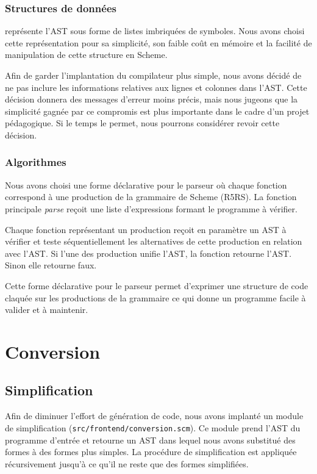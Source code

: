 \documentclass[11pt]{report}
\begin{document}
\subsection{Structures de données}

\sins{} représente l'AST sous forme de listes imbriquées de symboles. Nous
avons choisi cette représentation pour sa simplicité, son faible coût en
mémoire et la facilité de manipulation de cette structure en Scheme.

Afin de garder l'implantation du compilateur plus simple, nous avons
décidé de ne pas inclure les informations relatives aux lignes et
colonnes dans l'AST. Cette décision donnera des messages d'erreur
moins précis, mais nous jugeons que la simplicité gagnée par ce
compromis est plus importante dans le cadre d'un projet pédagogique.
Si le temps le permet, nous pourrons considérer revoir cette décision.

\subsection{Algorithmes}

Nous avons choisi une forme déclarative pour le parseur où chaque fonction
correspond à une production de la grammaire de Scheme (R5RS). La fonction
principale \emph{parse} reçoit une liste d'expressions formant le programme à
vérifier.

Chaque fonction représentant un production reçoit en paramètre un AST à
vérifier et teste séquentiellement les alternatives de cette production en
relation avec l'AST. Si l'une des production unifie l'AST, la fonction retourne
l'AST. Sinon elle retourne faux.

Cette forme déclarative pour le parseur permet d'exprimer une structure de
code claquée sur les productions de la grammaire ce qui donne un programme
facile à valider et à maintenir.


\chapter{Conversion}

\section{Simplification}

Afin de diminuer l'effort de génération de code, nous avons implanté
un module de simplification ({\tt src/frontend/conversion.scm}). Ce
module prend l'AST du programme d'entrée et retourne un AST dans
lequel nous avons substitué des formes à des formes plus simples. La
procédure de simplification est appliquée récursivement jusqu'à ce
qu'il ne reste que des formes simplifiées.
\end{document}
